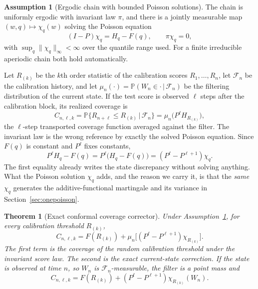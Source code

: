 \documentclass[11pt]{article}
\newtheorem{theorem}{Theorem}
\theoremstyle{definition}
\newtheorem{assumption}{Assumption}
\theoremstyle{remark}
\newcommand{\Prob}{\mathbb{P}}
\newcommand{\given}{\,|\,}
\newcommand{\Fcal}{\mathcal{F}}
\begin{document}
\begin{assumption}[Ergodic chain with bounded Poisson solutions]\label{as:chain}
The chain is uniformly ergodic with invariant law $\pi$, and there is a jointly measurable map
$(w,q)\mapsto\chi_q(w)$ solving the Poisson equation
\begin{equation}\label{eq:poisson}
  (I-P)\chi_q = H_q - F(q), \qquad \pi\chi_q = 0 ,
\end{equation}
with $\sup_q\|\chi_q\|_\infty<\infty$ over the quantile range used. For a finite irreducible
aperiodic chain both hold automatically.
\end{assumption}

Let $R_{(k)}$ be the $k$th order statistic of the calibration scores $R_1,\dots,R_n$, let
$\Fcal_n$ be the calibration history, and let $\mu_n(\cdot)=\Prob(W_n\in\cdot\given\Fcal_n)$
be the filtering distribution of the current state. If the test score is observed $\ell$
steps after the calibration block, its realized coverage is
\begin{equation}\label{eq:Cdef}
  C_{n,\ell,k} = \Prob\{R_{n+\ell}\le R_{(k)}\given \Fcal_n\}
    = \mu_n\big(P^{\ell}H_{R_{(k)}}\big),
\end{equation}
the $\ell$-step transported coverage function averaged against the filter. The invariant law
is the wrong reference by exactly the solved Poisson equation. Since $F(q)$ is constant and
$P^\ell$ fixes constants,
\begin{equation}\label{eq:disc}
  P^{\ell}H_q - F(q) = P^{\ell}\big(H_q-F(q)\big) = (P^{\ell}-P^{\ell+1})\chi_q .
\end{equation}
The first equality already writes the state discrepancy without solving anything. What the
Poisson solution $\chi_q$ adds, and the reason we carry it, is that the \emph{same} $\chi_q$
generates the additive-functional martingale and its variance in
Section~\ref{sec:onepoisson}.

\begin{theorem}[Exact conformal coverage corrector]\label{thm:corrector}
Under Assumption~\ref{as:chain}, for every calibration threshold $R_{(k)}$,
\begin{equation}\label{eq:corrector}
  C_{n,\ell,k} = F(R_{(k)}) + \mu_n\big[(P^{\ell}-P^{\ell+1})\chi_{R_{(k)}}\big] .
\end{equation}
The first term is the coverage of the random calibration threshold under the invariant score
law. The second is the exact current-state correction. If the state is observed at time $n$,
so $W_n$ is $\Fcal_n$-measurable, the filter is a point mass and
\begin{equation}\label{eq:corrector-obs}
  C_{n,\ell,k} = F(R_{(k)}) + (P^{\ell}-P^{\ell+1})\chi_{R_{(k)}}(W_n) .
\end{equation}
\end{theorem}
\end{document}
